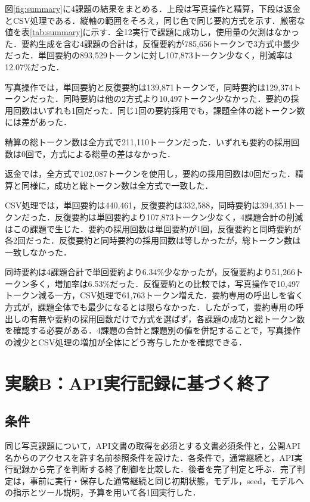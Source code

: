 \documentclass[letter]{ieicej}
\begin{document}
図\ref{fig:summary}に4課題の結果をまとめる．上段は写真操作と精算，下段は返金とCSV処理である．縦軸の範囲をそろえ，同じ色で同じ要約方式を示す．厳密な値を表\ref{tab:summary}に示す．全12実行で課題に成功し，使用量の欠測はなかった．要約生成を含む4課題の合計は，反復要約が785,656トークンで3方式中最少だった．単回要約の893,529トークンに対し107,873トークン少なく，削減率は12.07\%だった．

\SummaryResultsTable

写真操作では，単回要約と反復要約は139,871トークンで，同時要約は129,374トークンだった．同時要約は他の2方式より10,497トークン少なかった．要約の採用回数はいずれも1回だった．同じ1回の要約採用でも，課題全体の総トークン数には差があった．

精算の総トークン数は全方式で211,110トークンだった．いずれも要約の採用回数は0回で，方式による総量の差はなかった．

返金では，全方式で102,087トークンを使用し，要約の採用回数は0回だった．精算と同様に，成功と総トークン数は全方式で一致した．

CSV処理では，単回要約は440,461，反復要約は332,588，同時要約は394,351トークンだった．反復要約は単回要約より107,873トークン少なく，4課題合計の削減はこの課題で生じた．要約の採用回数は単回要約が1回，反復要約と同時要約が各2回だった．反復要約と同時要約の採用回数は等しかったが，総トークン数は一致しなかった．

同時要約は4課題合計で単回要約より6.34\%少なかったが，反復要約より51,266トークン多く，増加率は6.53\%だった．反復要約との比較では，写真操作で10,497トークン減る一方，CSV処理で61,763トークン増えた．要約専用の呼出しを省く方式が，課題全体でも最少になるとは限らなかった．したがって，要約専用の呼出しの有無や要約の採用回数だけで方式を選ばず，各課題の成功と総トークン数を確認する必要がある．4課題の合計と課題別の値を併記することで，写真操作の減少とCSV処理の増加が全体にどう寄与したかを確認できる．

\section{実験B：API実行記録に基づく終了}

\subsection{条件}

同じ写真課題について，API文書の取得を必須とする文書必須条件と，公開API名からのアクセスを許す名前参照条件を設けた．各条件で，通常継続と，API実行記録から完了を判断する終了制御を比較した．後者を完了判定と呼ぶ．完了判定は，事前に実行・保存した通常継続と同じ初期状態，モデル，seed，モデルへの指示とツール説明，予算を用いて各1回実行した．
\end{document}

